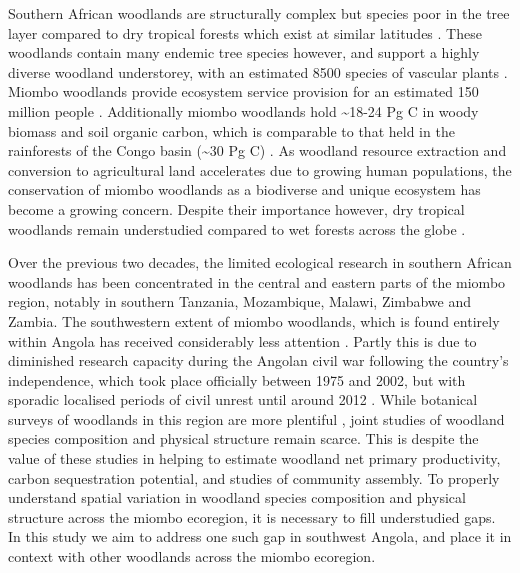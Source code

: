 \begin{refsection}
Southern African woodlands are structurally complex but species poor in the tree layer compared to dry tropical forests which exist at similar latitudes \citep{DRYFLOR2016, Torello-raventos2013}. These woodlands contain many endemic tree species however, and support a highly diverse woodland understorey, with an estimated 8500 species of vascular plants \citep{Frost1996}. Miombo woodlands provide ecosystem service provision for an estimated 150 million people \citep{Ryan2016}. Additionally miombo woodlands hold \textasciitilde{}18-24 Pg C in woody biomass and soil organic carbon, which is comparable to that held in the rainforests of the Congo basin (\textasciitilde{}30 Pg C) \citep{Mayaux2008}. As woodland resource extraction and conversion to agricultural land accelerates due to growing human populations, the conservation of miombo woodlands as a biodiverse and unique ecosystem has become a growing concern. Despite their importance however, dry tropical woodlands remain understudied compared to wet forests across the globe \citep{Clarke2017}. 

Over the previous two decades, the limited ecological research in southern African woodlands has been concentrated in the central and eastern parts of the miombo region, notably in southern Tanzania, Mozambique, Malawi, Zimbabwe and Zambia. The southwestern extent of miombo woodlands, which is found entirely within Angola has received considerably less attention \citep{Huntley2019}. Partly this is due to diminished research capacity during the Angolan civil war following the country's independence, which took place officially between 1975 and 2002, but with sporadic localised periods of civil unrest until around 2012 \citep{Oliveira2015}. While botanical surveys of woodlands in this region are more plentiful \citep{Huntley2019, Figueiredo2009}, joint studies of woodland species composition and physical structure remain scarce. This is despite the value of these studies in helping to estimate woodland net primary productivity, carbon sequestration potential, and studies of community assembly. To properly understand spatial variation in woodland species composition and physical structure across the miombo ecoregion, it is necessary to fill understudied gaps. In this study we aim to address one such gap in southwest Angola, and place it in context with other woodlands across the miombo ecoregion.


\end{refsection}
